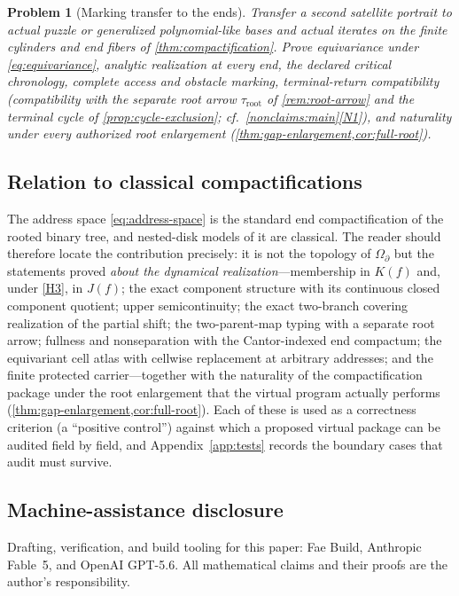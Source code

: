 \documentclass[11pt,reqno]{amsart}
\numberwithin{equation}{section}
\theoremstyle{plain}
\newtheorem{problem}[theorem]{Problem}
\theoremstyle{definition}
\theoremstyle{remark}
\newcommand{\OmB}{\Omega_\partial}
\newcommand{\troot}{\tau_{\mathrm{root}}}
\begin{document}
\begin{problem}[Marking transfer to the ends]
\label{prob:marking-transfer}
Transfer a second satellite portrait to actual puzzle or generalized
polynomial-like bases and actual iterates on the finite cylinders and
end fibers of \cref{thm:compactification}.  Prove equivariance under
\eqref{eq:equivariance}, analytic realization at every end, the declared
critical chronology, complete access and obstacle marking,
terminal-return compatibility (compatibility with the separate root
arrow $\troot$ of \cref{rem:root-arrow} and the terminal cycle of
\cref{prop:cycle-exclusion}; cf.\ \cref{nonclaims:main}\ref{N1}), and
naturality under every authorized root enlargement
(\cref{thm:gap-enlargement,cor:full-root}).
\end{problem}

\subsection{Relation to classical compactifications}

The address space \eqref{eq:address-space} is the standard end
compactification of the rooted binary tree, and nested-disk models of
it are classical.  The reader should therefore locate the contribution
precisely: it is not the topology of $\OmB$ but the statements proved
\emph{about the dynamical realization}---membership in $K(f)$ and, under
\ref{H3}, in $J(f)$; the exact component structure with its continuous
closed component quotient; upper semicontinuity; the exact two-branch
covering realization of the partial shift; the two-parent-map typing
with a separate root arrow; fullness and nonseparation with the
Cantor-indexed end compactum; the equivariant cell atlas with cellwise
replacement at arbitrary addresses; and the finite protected
carrier---together with the naturality of the compactification package
under the root enlargement that the virtual program actually performs
(\cref{thm:gap-enlargement,cor:full-root}).  Each of these is used as a
correctness criterion (a ``positive control'') against which a proposed
virtual package can be audited field by field, and
Appendix~\ref{app:tests} records the boundary cases that audit must
survive.

\subsection*{Machine-assistance disclosure}
Drafting, verification, and build tooling for this paper: Fae Build,
Anthropic Fable~5, and OpenAI GPT-5.6.  All mathematical claims and
their proofs are the author's responsibility.
\end{document}

